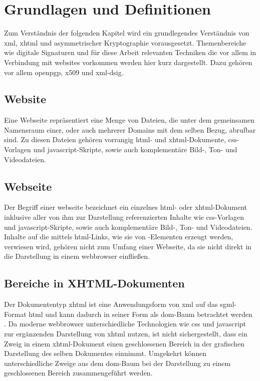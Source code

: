 
\chapter{Grundlagen und Definitionen}
\label{chap:GrundlagenDefinitionen}

Zum Verständnis der folgenden Kapitel wird ein grundlegendes Verständnis von \gls{xml}, \gls{xhtml} und asymmetrischer Kryptographie vorausgesetzt.
Themenbereiche wie digitale Signaturen und für diese Arbeit relevanten Techniken die vor allem in Verbindung mit \glspl{website} vorkommen werden hier kurz
dargestellt. Dazu gehören vor allem \gls{openpgp}, \gls{x509} und \gls{xml-dsig}.

\section{Website}
\label{sec:GrundlagenDefinitionen:Website}
Eine Webseite repräsentiert eine Menge von Dateien, die unter dem gemeinsamen Namensraum einer, oder auch mehrerer Domains mit dem selben Bezug, abrufbar sind.
Zu diesen Dateien gehören vorrangig \gls{html}- und \gls{xhtml}-Dokumente, \gls{css}-Vorlagen und \gls{javascript}-Skripte, sowie auch komplementäre Bild-, Ton- und
Videodateien.

\section{Webseite}
\label{sec:GrundlagenDefinitionen:Webseiten}
Der Begriff einer \gls{webseite} bezeichnet ein einzelnes \gls{html}- oder \gls{xhtml}-Dokument inklusive aller von ihm zur Darstellung referenzierten
Inhalte wie \gls{css}-Vorlagen und \gls{javascript}-Skripte, sowie auch komplementäre Bild-, Ton- und Videodateien. Inhalte auf die mittels \gls{html}-Links, wie sie
von -Elementen erzeugt werden, verwiesen wird, gehören nicht zum Umfang einer Webseite, da sie nicht direkt in die Darstellung in einem
\gls{webbrowser} einfließen.

\section{Bereiche in XHTML-Dokumenten}
\label{sec:GrundlagenDefinitionen:BereicheXHTML}
Der Dokumententyp \gls{xhtml} ist eine Anwendungsform von \gls{xml} auf das \gls{sgml}-Format \gls{html}\cite{xhtml:w3c} und kann dadurch in seiner Form als
\gls{dom}-Baum betrachtet werden \cite{xhtml:oreilly}. Da moderne \Gls{webbrowser} unterschiedliche Technologien wie \gls{css} und \gls{javascript} zur
ergänzenden Darstellung von \gls{xhtml} nutzen, ist nicht sichergestellt, dass ein Zweig in einem \gls{xhtml}-Dokument einen geschlossenen Bereich in der
grafischen Darstellung des selben Dokumentes einnimmt. Umgekehrt können unterschiedliche Zweige aus dem \gls{dom}-Baum bei der Darstellung zu einem
geschlossenen Bereich zusammengeführt werden.

